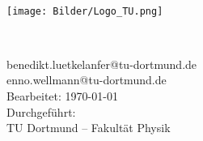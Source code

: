 \begin{titlingpage}
    \begin{center}
        \begin{Huge}
            \textbf{\thetitle\\}
        \end{Huge}
    \end{center}
    \vspace{4cm}
    \texttt{[image: Bilder/Logo\_TU.png]} \\
    \vspace{4cm}
    \begin{center}
        \begin{huge}
            \theauthor\\
        \end{huge}
        \vspace{0.5cm}
        \begin{Large}
            benedikt.luetkelanfer@tu-dortmund.de\\
            enno.wellmann@tu-dortmund.de\\
            \vspace{1.4cm}
            Bearbeitet: \today\\
            Durchgeführt: \thedate\\
            TU Dortmund – Fakultät Physik\\
        \end{Large}
    \end{center}
\end{titlingpage}